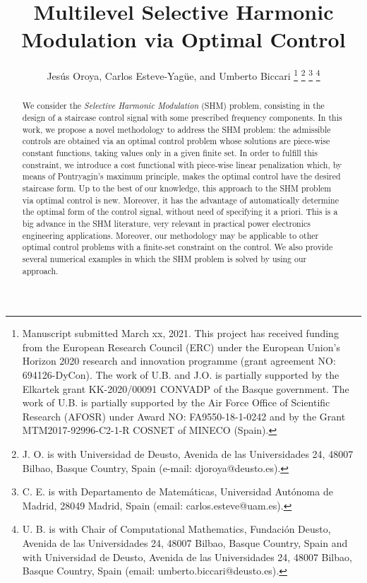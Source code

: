 \documentclass[9pt,shortpaper,twoside,web]{ieeecolor}
\begin{document}
	
\title{Multilevel Selective Harmonic Modulation via Optimal Control} 

\author{Jes\'us Oroya, Carlos Esteve-Yag\"ue, and Umberto Biccari
\thanks{Manuscript submitted March xx, 2021. This project has received funding from the European Research Council (ERC) under the European Union’s Horizon 2020 research and innovation programme (grant agreement NO: 694126-DyCon). The work of U.B. and J.O. is partially supported by the Elkartek grant KK-2020/00091 CONVADP of the Basque government. The work of U.B. is partially supported by the Air Force Office of Scientific Research (AFOSR) under Award NO: FA9550-18-1-0242 and by the Grant MTM2017-92996-C2-1-R COSNET of MINECO (Spain).}
\thanks{J. O. is with Universidad de Deusto, Avenida de las Universidades 24, 48007 Bilbao, Basque Country, Spain (e-mail: djoroya@deusto.es).}
\thanks{C. E. is with Departamento de Matem\'aticas, Universidad Aut\'onoma de Madrid, 28049 Madrid, Spain (email: carlos.esteve@uam.es).}
\thanks{U. B. is with Chair of Computational Mathematics, Fundaci\'on Deusto, Avenida de las Universidades 24, 48007 Bilbao, Basque Country, Spain and with Universidad de Deusto, Avenida de las Universidades 24, 48007 Bilbao, Basque Country, Spain (email: umberto.biccari@deusto.es).}
}
\maketitle

\begin{abstract}
	We consider the \emph{Selective Harmonic Modulation} (SHM) problem, consisting in the design of a staircase control signal with some prescribed frequency components. In this work, we propose a novel methodology to  address the SHM problem: the admissible controls are obtained via an optimal control problem whose solutions are piece-wise constant functions, taking values only in a given finite set. In order to fulfill this constraint, we introduce a cost functional with piece-wise linear penalization which, by means of Pontryagin's maximum principle, makes the optimal control have the desired staircase form. Up to the best of our knowledge, this approach to the SHM problem via optimal control is new. Moreover, it has the  advantage of automatically determine the optimal form of the control signal, without need of specifying it a priori. This is a big advance in the SHM literature, very relevant in practical power electronics engineering applications. Moreover, our methodology may be applicable to other optimal control problems with a finite-set constraint on the control. We also provide several numerical examples in which the SHM problem is solved by using our approach.
\end{abstract}
\end{document}
